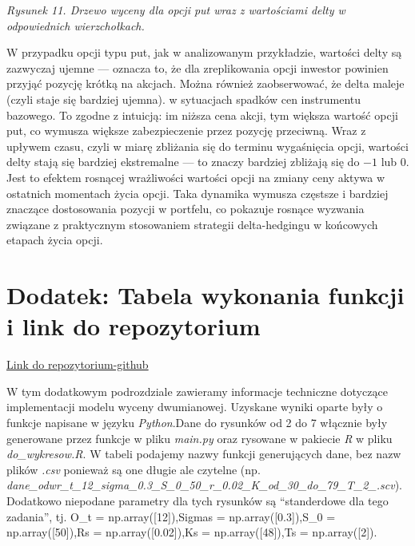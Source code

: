 \documentclass[
]{article}
\begin{document}
\emph{Rysunek 11. Drzewo wyceny dla opcji put wraz z wartościami delty w
odpowiednich wierzchołkach.}

W przypadku opcji typu put, jak w analizowanym przykładzie, wartości
delty są zazwyczaj ujemne --- oznacza to, że dla zreplikowania opcji
inwestor powinien przyjąć pozycję krótką na akcjach. Można również
zaobserwować, że delta maleje (czyli staje się bardziej ujemna). w
sytuacjach spadków cen instrumentu bazowego. To zgodne z intuicją: im
niższa cena akcji, tym większa wartość opcji put, co wymusza większe
zabezpieczenie przez pozycję przeciwną. Wraz z upływem czasu, czyli w
miarę zbliżania się do terminu wygaśnięcia opcji, wartości delty stają
się bardziej ekstremalne --- to znaczy bardziej zbliżają się do \(-1\)
lub \(0\). Jest to efektem rosnącej wrażliwości wartości opcji na zmiany
ceny aktywa w ostatnich momentach życia opcji. Taka dynamika wymusza
częstsze i bardziej znaczące dostosowania pozycji w portfelu, co
pokazuje rosnące wyzwania związane z praktycznym stosowaniem strategii
delta-hedgingu w końcowych etapach życia opcji.

\hypertarget{dodatek-tabela-wykonania-funkcji-i-link-do-repozytorium}{%
\section{Dodatek: Tabela wykonania funkcji i link do
repozytorium}\label{dodatek-tabela-wykonania-funkcji-i-link-do-repozytorium}}

\href{https://github.com/Jankozlowski1234/wdif_projekt}{Link do
repozytorium-github}

W tym dodatkowym podrozdziale zawieramy informacje techniczne dotyczące
implementacji modelu wyceny dwumianowej. Uzyskane wyniki oparte były o
funkcje napisane w języku \emph{Python}.Dane do rysunków od 2 do 7
włącznie były generowane przez funkcje w pliku \emph{main.py} oraz
rysowane w pakiecie \emph{R} w pliku \emph{do\_wykresow.R}. W tabeli
podajemy nazwy funkcji generujących dane, bez nazw plików \emph{.csv}
ponieważ są one długie ale czytelne (np.
\emph{dane\_odwr\_t\_12\_sigma\_0.3\_S\_0\_50\_r\_0.02\_K\_od\_30\_do\_79\_T\_2\_.scv}).
Dodatkowo niepodane parametry dla tych rysunków są ``standerdowe dla
tego zadania'', tj. O\_t = np.array({[}12{]}),Sigmas =
np.array({[}0.3{]}),S\_0 = np.array({[}50{]}),Rs =
np.array({[}0.02{]}),Ks = np.array({[}48{]}),Ts = np.array({[}2{]}).

\begingroup\fontsize{7}{9}\selectfont
\end{document}
